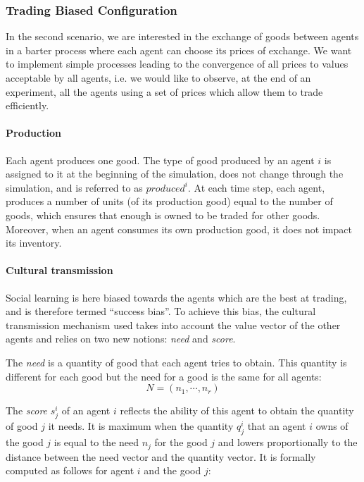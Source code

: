 \documentclass[a4paper]{article}
\begin{document}
\subsubsection{Trading Biased Configuration}\label{sec:tc:trade}

In the second scenario, we are interested in the exchange of goods between agents in a barter process where each agent can choose its prices of exchange. We want to implement simple processes leading to the convergence of all prices to values acceptable by all agents, i.e. we would like to observe, at the end of an experiment, all the agents using a set of prices which allow them to trade efficiently.

\paragraph{Production} Each agent produces one good. The type of good produced by an agent $i$ is assigned to it at the beginning of the simulation, does not change through the simulation, and is referred to as $produced^i$. At each time step, each agent, produces a number of units (of its production good) equal to the number of goods, which ensures that enough is owned to be traded for other goods. Moreover, when an agent consumes its own production good, it does not impact its inventory.

\paragraph{Cultural transmission}
Social learning is here biased towards the agents which are the best at trading, and is therefore termed ``success bias''. To achieve this bias, the cultural transmission mechanism used takes into account the value vector of the other agents and relies on two new notions: \emph{need} and \emph{score}. 

The \emph{need} is a quantity of good that each agent tries to obtain. This quantity is different for each good but the need for a good is the same for all agents:
$$ N = (n_1, \cdots, n_r) $$ 

The \emph{score} $s^i_j$ of an agent $i$ reflects the ability of this agent to obtain the quantity of good $j$ it needs. It is maximum when the quantity $q^i_j$ that an agent $i$ owns of the good $j$ is equal to the need $n_j$ for the good $j$ and lowers proportionally to the distance between the need vector and the quantity vector.  It is formally computed as follows for agent $i$ and the good $j$:
\end{document}
